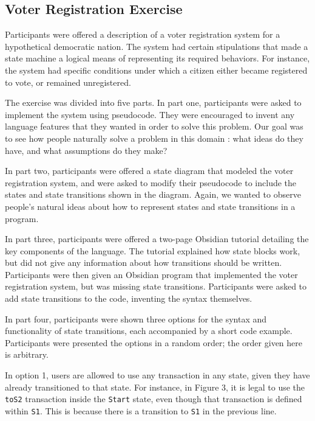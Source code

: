 \documentclass[sigplan,10pt,review]{acmart}\settopmatter{printfolios=true}
\begin{document}
\subsection{Voter Registration Exercise}

Participants were offered a description of a voter registration system for a hypothetical democratic nation. The 
system had certain stipulations that made a state machine a logical means of representing its required behaviors. 
For instance, the system had specific conditions under which a citizen either became registered to vote, 
or remained unregistered. 

The exercise was divided into five parts. In part one, participants were asked to implement the system using 
pseudocode. They were encouraged to invent any language features that they wanted in order to solve this 
problem. Our goal was to see how people naturally solve a problem in this domain \cite{Myers}: what ideas do they 
have, and what assumptions do they make? 
	
In part two, participants were offered a state diagram that modeled the voter registration system, and were asked to 
modify their pseudocode to include the states and state transitions shown in the diagram. Again, we wanted to 
observe people's natural ideas about how to represent states and state transitions in a program.

In part three, participants were offered a two-page Obsidian tutorial detailing the key components of the language. 
The tutorial explained how state blocks work, but did not give any information about how transitions should be 
written. Participants were then given an Obsidian program that implemented the voter registration system, but was 
missing state transitions. Participants were asked to add state transitions to the code, inventing the syntax 
themselves.

In part four, participants were shown three options for the syntax and functionality of state transitions, each 
accompanied by a short code example. Participants were presented the options in a random order; the order given 
here is arbitrary.

In option 1, users are allowed to use any transaction in any state, given they have already transitioned to that 
state. For instance, in Figure 3, it is legal to use the \texttt{\small{toS2}} transaction inside the \texttt{\small{Start}} 
state, even though that transaction is defined within \texttt{\small{S1}}. This is because there is a transition to 
\texttt{\small{S1}} in the previous line.
\end{document}
